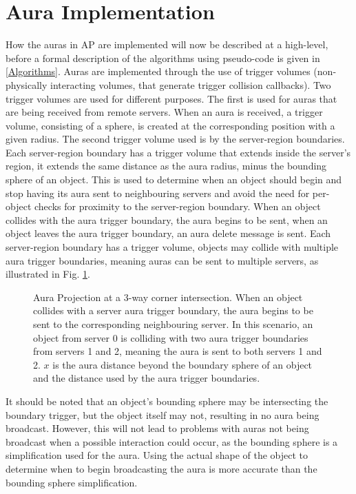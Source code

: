\section{Aura Implementation}
How the auras in AP are implemented will now be described at a high-level, before a formal description of the algorithms using pseudo-code is given in \ref{Algorithms}.
Auras are implemented through the use of trigger volumes (non-physically interacting volumes, that generate trigger collision callbacks). Two trigger volumes are used for different purposes. 
The first is used for auras that are being received from remote servers. When an aura is received, a trigger volume, consisting of a sphere, is created at the corresponding position with a given radius. The second trigger volume used is by the server-region boundaries. Each server-region boundary has a trigger volume that extends inside the server's region, it extends the same distance as the aura radius, minus the bounding sphere of an object. This is used to determine when an object should begin and stop having its aura sent to neighbouring servers and avoid the need for per-object checks for proximity to the server-region boundary. When an object collides with the aura trigger boundary, the aura begins to be sent, when an object leaves the aura trigger boundary, an aura delete message is sent.
Each server-region boundary has a trigger volume, objects may collide with multiple aura trigger boundaries, meaning auras can be sent to multiple servers, as illustrated in Fig. \ref{AuraCorner}.

\begin{figure}
	\centering
	\scalebox{0.75}{}
	\caption{Aura Projection at a 3-way corner intersection. When an object collides with a server aura trigger boundary, the aura begins to be sent to the corresponding neighbouring server. In this scenario, an object from server 0 is colliding with two aura trigger boundaries from servers 1 and 2, meaning the aura is sent to both servers 1 and 2. $x$ is the aura distance beyond the boundary sphere of an object and the distance used by the aura trigger boundaries.}
	\label{AuraCorner}
\end{figure}

It should be noted that an object's bounding sphere may be intersecting the boundary trigger, but the object itself may not, resulting in no aura being broadcast. However, this will not lead to problems with auras not being broadcast when a possible interaction could occur, as the bounding sphere is a simplification used for the aura. Using the actual shape of the object to determine when to begin broadcasting the aura is more accurate than the bounding sphere simplification.

